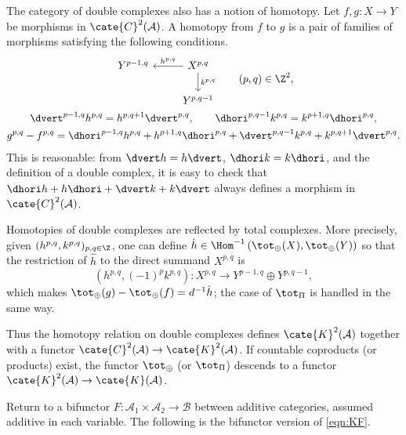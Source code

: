 The category of double complexes also has a notion of homotopy. Let
$f,g:X\to Y$ be morphisms in $\cate{C}^2(\mathcal{A})$. A homotopy from $f$
to $g$ is a pair of families of morphisms satisfying the following
conditions. 
\begin{equation*}\begin{gathered}
\begin{tikzcd}
	Y^{p-1, q} & X^{p,q} \arrow[l, "{h^{p,q}}"'] \arrow[d, "{k^{p, q}}"] \\
	& Y^{p, q-1}
\end{tikzcd} \qquad (p,q) \in \Z^2 , \\
	\dvert^{p-1, q} h^{p, q} = h^{p, q+1} \dvert^{p, q}, \qquad \dhori^{p, q-1} k^{p,q} = k^{p+1, q} \dhori^{p,q}, \\
	g^{p,q} - f^{p, q} = \dhori^{p-1, q} h^{p,q} + h^{p+1, q} \dhori^{p,q} + \dvert^{p, q-1} k^{p,q} + k^{p, q+1} \dvert^{p,q}.
\end{gathered}\end{equation*}
This is reasonable: from $\dvert h=h\dvert$, $\dhori k=k\dhori$, and the
definition of a double complex, it is easy to check that
$\dhori h+h\dhori+\dvert k+k\dvert$ always defines a morphism in
$\cate{C}^2(\mathcal{A})$.

Homotopies of double complexes are reflected by total complexes. More
precisely, given $(h^{p,q},k^{p,q})_{p,q\in\Z}$, one can define
$\hat{h}\in\Hom^{-1}\left(\tot_{\oplus}(X),\tot_{\oplus}(Y)\right)$ so that
the restriction of $\hat{h}$ to the direct summand $X^{p,q}$ is
\[ \left( h^{p,q}, (-1)^p k^{p,q} \right): X^{p,q} \to Y^{p-1, q} \oplus Y^{p, q-1}, \]
which makes $\tot_{\oplus}(g)-\tot_{\oplus}(f)=d^{-1}\hat{h}$; the case of
$\tot_{\Pi}$ is handled in the same way.

Thus the homotopy relation on double complexes defines
$\cate{K}^2(\mathcal{A})$ together with a functor
$\cate{C}^2(\mathcal{A})\to\cate{K}^2(\mathcal{A})$. If countable
coproducts (or products) exist, the functor $\tot_{\oplus}$ (or
$\tot_{\Pi}$) descends to a functor
$\cate{K}^2(\mathcal{A})\to\cate{K}(\mathcal{A})$.

Return to a bifunctor $F:\mathcal{A}_1\times\mathcal{A}_2\to\mathcal{B}$
between additive categories, assumed additive in each variable. The following
is the bifunctor version of \eqref{eqn:KF}.

